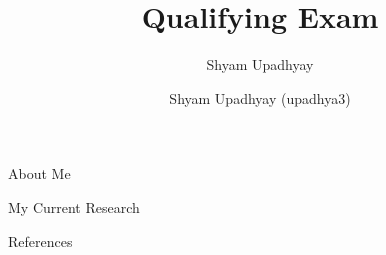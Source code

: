 

\author{Shyam Upadhyay}
\title{Qualifying Exam}

\date{Shyam Upadhyay (upadhya3)} 



\begin{frame}
\titlepage
\end{frame}

\begin{frame}{About Me}
\end{frame}

\begin{frame}{My Current Research}
\end{frame}





\begin{frame}[allowframebreaks]{References}
  \def\newblock{}
  
  
\end{frame}


